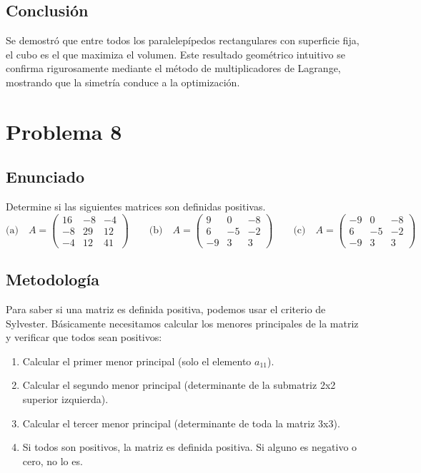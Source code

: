 \documentclass{article}
\begin{document}
\subsection{Conclusión}

Se demostró que entre todos los paralelepípedos rectangulares con superficie fija, el cubo es el que maximiza el volumen. Este resultado geométrico intuitivo se confirma rigurosamente mediante el método de multiplicadores de Lagrange, mostrando que la simetría conduce a la optimización.

\section{Problema 8}

\subsection{Enunciado}
Determine si las siguientes matrices son definidas positivas.
\[
\text{(a)}\quad
A=\begin{pmatrix}
16 & -8 & -4\\
-8 & 29 & 12\\
-4 & 12 & 41
\end{pmatrix}
\qquad
\text{(b)}\quad
A=\begin{pmatrix}
9 & 0 & -8\\
6 & -5 & -2\\
-9 & 3 & 3
\end{pmatrix}
\qquad
\text{(c)}\quad
A=\begin{pmatrix}
-9 & 0 & -8\\
6 & -5 & -2\\
-9 & 3 & 3
\end{pmatrix}
\]

\subsection{Metodología}

Para saber si una matriz es definida positiva, podemos usar el criterio de Sylvester. Básicamente necesitamos calcular los menores principales de la matriz y verificar que todos sean positivos:
\begin{enumerate}
    \item Calcular el primer menor principal (solo el elemento $a_{11}$).
    \item Calcular el segundo menor principal (determinante de la submatriz 2x2 superior izquierda).
    \item Calcular el tercer menor principal (determinante de toda la matriz 3x3).
    \item Si todos son positivos, la matriz es definida positiva. Si alguno es negativo o cero, no lo es.
\end{enumerate}
\end{document}
